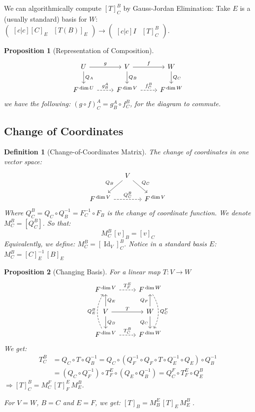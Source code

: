 \documentclass[12pt]{article}
\let\RA\Rightarrow
\DeclareMathOperator{\Id}{Id}
\newtheorem{definition}{Definition}[subsection]
\newtheorem{proposition}{Proposition}[subsection]
\begin{document}
We can algorithmically compute $[T]^B_C$ by Gauss-Jordan Elimination: Take $E$ is a (usually standard) basis for $W$: $\begin{pmatrix}[c|c][C]_E & [T(B)]_E\end{pmatrix}\to\begin{pmatrix}[c|c]I &[T]^B_C\end{pmatrix}$.

\begin{proposition}[Representation of Composition]
  $$
  \begin{tikzcd}
    U \arrow{r}{g} \arrow{d}{Q_A}
    & V \arrow{r}{f} \arrow{d}{Q_B}
    & W \arrow{d}{Q_C}\\
    F^{\,\dim U} \arrow[dashed]{r}{g_B^A}
    & F^{\,\dim V} \arrow[dashed]{r}{f_C^B}
    & F^{\,\dim W}
  \end{tikzcd}
  $$
  we have the following: $(g\circ f)^A_C=g^A_B\circ f^B_C$, for the diagram to commute.
\end{proposition}

\subsection{Change of Coordinates}

\begin{definition}[Change-of-Coordinates Matrix]
  The change of coordinates in one vector space:
  $$
  \begin{tikzcd}[column sep=small]
    & V \arrow[swap]{dl}{Q_B} \arrow{dr}{Q_C} &\\
    F^{\,\dim V} \arrow[dashed]{rr}{Q^B_C} 
    & & F^{\,\dim V}
  \end{tikzcd}
  $$
  Where $Q^B_C=Q_C\circ Q_B^{-1}=F_C^{-1}\circ F_B$ is the change of coordinate function. We denote $M^B_C=[Q^B_C]$. So that: $$M^B_C\,[v]_B=[v]_C$$
  Equivalently, we define: $M^B_C=[\Id_V]^B_C$. Notice in a standard basis $E$: $M^B_C=[C]_E^{-1}\,[B]_E$
\end{definition} 

\begin{proposition}[Changing Basis]
  For a linear map $T: V\to W$
  $$
  \begin{tikzcd}
    F^{\,\dim V} \arrow[dashed]{r}{T_F^E}
    & F^{\,\dim W}\arrow[bend left,dashed]{dd}{Q^F_C}\\
    V \arrow{r}{T} \arrow{d}{Q_B}\arrow[swap]{u}{Q_E}
    & W \arrow[swap]{d}{Q_C}\arrow{u}{Q_F}\\
    \arrow[bend left,dashed]{uu}{Q^B_E} F^{\,\dim V} \arrow[dashed]{r}{T_C^B}
    & F^{\,\dim W}
  \end{tikzcd}
  $$
  We get: 
  \begin{align*}
    T^B_C&=Q_C\circ T\circ Q_B^{-1}=Q_C\circ\left(Q_F^{-1}\circ Q_F \circ T\circ Q_E^{-1}\circ Q_E\right)\circ Q_B^{-1}\\
    &=\left(Q_C\circ Q_F^{-1}\right)\circ T^E_F\circ\left(Q_E\circ Q_B^{-1}\right)=Q^F_C\circ T^E_F\circ Q_E^B
  \end{align*}
  $\RA [T]^B_C=M^F_C\,[T]^E_F\,M_E^B$.

  For $V=W$, $B=C$ and $E=F$, we get: $[T]_B=M^E_B\,[T]_E\,M^B_E\;$.
\end{proposition}
\end{document}
